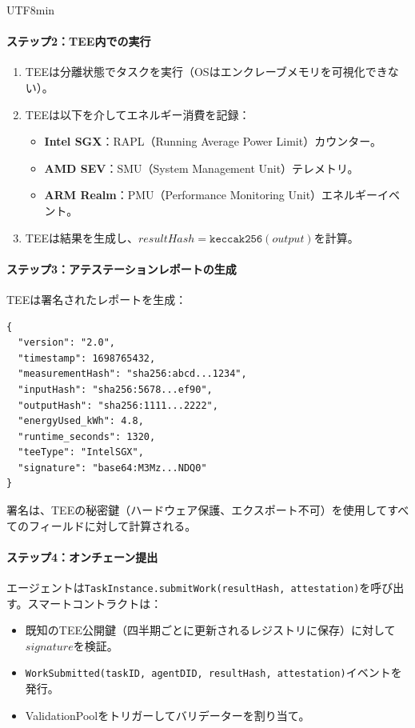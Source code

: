 \documentclass[11pt]{article}
\begin{document}
\begin{CJK}{UTF8}{min}
\paragraph{ステップ2：TEE内での実行}
\begin{enumerate}[noitemsep]
  \item TEEは分離状態でタスクを実行（OSはエンクレーブメモリを可視化できない）。
  \item TEEは以下を介してエネルギー消費を記録：
    \begin{itemize}[noitemsep]
      \item \textbf{Intel SGX}：RAPL（Running Average Power Limit）カウンター。
      \item \textbf{AMD SEV}：SMU（System Management Unit）テレメトリ。
      \item \textbf{ARM Realm}：PMU（Performance Monitoring Unit）エネルギーイベント。
    \end{itemize}
  \item TEEは結果を生成し、$resultHash = \texttt{keccak256}(output)$を計算。
\end{enumerate}

\paragraph{ステップ3：アテステーションレポートの生成}
TEEは署名されたレポートを生成：
\begin{verbatim}
{
  "version": "2.0",
  "timestamp": 1698765432,
  "measurementHash": "sha256:abcd...1234",
  "inputHash": "sha256:5678...ef90",
  "outputHash": "sha256:1111...2222",
  "energyUsed_kWh": 4.8,
  "runtime_seconds": 1320,
  "teeType": "IntelSGX",
  "signature": "base64:M3Mz...NDQ0"
}
\end{verbatim}
署名は、TEEの秘密鍵（ハードウェア保護、エクスポート不可）を使用してすべてのフィールドに対して計算される。

\paragraph{ステップ4：オンチェーン提出}
エージェントは\texttt{TaskInstance.submitWork(resultHash, attestation)}を呼び出す。スマートコントラクトは：
\begin{itemize}[noitemsep]
  \item 既知のTEE公開鍵（四半期ごとに更新されるレジストリに保存）に対して$signature$を検証。
  \item \texttt{WorkSubmitted(taskID, agentDID, resultHash, attestation)}イベントを発行。
  \item ValidationPoolをトリガーしてバリデーターを割り当て。
\end{itemize}


\end{CJK}
\end{document}
